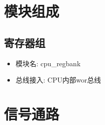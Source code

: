 \documentclass[10pt]{book}
\begin{document}
\section{模块组成}
\subsection{寄存器组}
\begin{itemize}
  \item 模块名: cpu\_regbank
  \item 总线接入: CPU内部wor总线
\end{itemize}

\section{信号通路}
\end{document}
